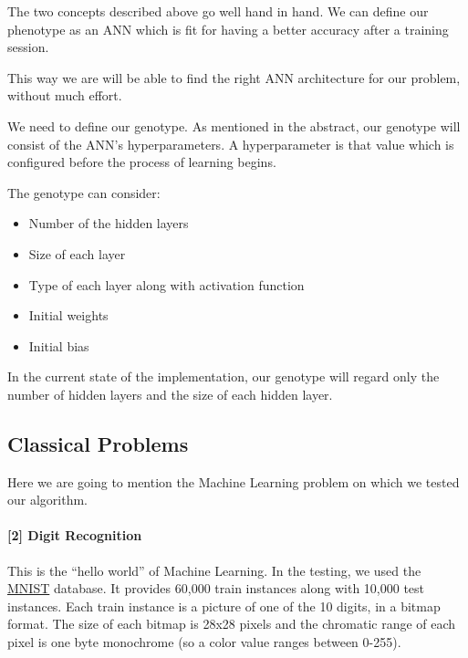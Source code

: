 \documentclass[11pt]{article}
\providecommand{\tightlist}{%
      \setlength{\itemsep}{0pt}\setlength{\parskip}{0pt}}
\begin{document}
The two concepts described above go well hand in hand. We can define our
phenotype as an ANN which is fit for having a better accuracy after a
training session.

This way we are will be able to find the right ANN architecture for our
problem, without much effort.

We need to define our genotype. As mentioned in the abstract, our
genotype will consist of the ANN's hyperparameters. A hyperparameter is
that value which is configured before the process of learning begins.

The genotype can consider:

\begin{itemize}
\tightlist
\item
  Number of the hidden layers
\item
  Size of each layer
\item
  Type of each layer along with activation function
\item
  Initial weights
\item
  Initial bias
\end{itemize}

In the current state of the implementation, our genotype will regard
only the number of hidden layers and the size of each hidden layer.

    \hypertarget{classical-problems}{%
\subsection{Classical Problems}\label{classical-problems}}

Here we are going to mention the Machine Learning problem on which we
tested our algorithm.

\hypertarget{digit-recognition}{%
\paragraph{{[}2{]} Digit Recognition}\label{digit-recognition}}

This is the ``hello world'' of Machine Learning. In the testing, we used
the \href{http://yann.lecun.com/exdb/mnist/}{MNIST} database. It
provides 60,000 train instances along with 10,000 test instances. Each
train instance is a picture of one of the 10 digits, in a bitmap format.
The size of each bitmap is 28x28 pixels and the chromatic range of each
pixel is one byte monochrome (so a color value ranges between 0-255).
\end{document}
